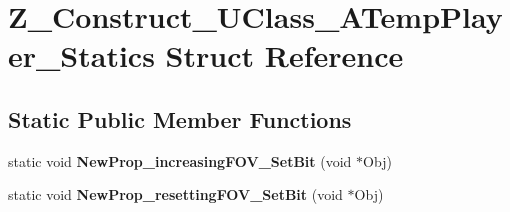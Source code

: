 \hypertarget{struct_z___construct___u_class___a_temp_player___statics}{}\section{Z\+\_\+\+Construct\+\_\+\+U\+Class\+\_\+\+A\+Temp\+Player\+\_\+\+Statics Struct Reference}
\label{struct_z___construct___u_class___a_temp_player___statics}
\subsection*{Static Public Member Functions}
\begin{DoxyCompactItemize}
\item 
\mbox{\label{struct_z___construct___u_class___a_temp_player___statics_a269607ac59356e80da290c47ecb944d4}} 
static void {\bfseries New\+Prop\+\_\+increasing\+F\+O\+V\+\_\+\+Set\+Bit} (void $\ast$Obj)
\item 
\mbox{\label{struct_z___construct___u_class___a_temp_player___statics_aec87adf237371cdcb6792072f0d30095}} 
static void {\bfseries New\+Prop\+\_\+resetting\+F\+O\+V\+\_\+\+Set\+Bit} (void $\ast$Obj)
\end{DoxyCompactItemize}
